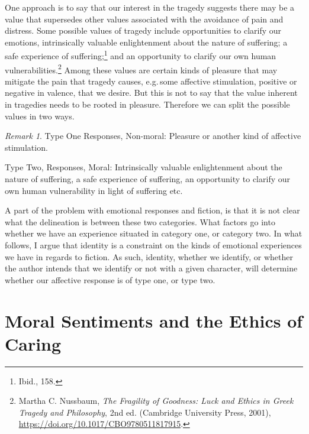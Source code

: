 \documentclass[phdthesis,12pt,final]{wuthesis}
\theoremstyle{definition}
\theoremstyle{definition}
\theoremstyle{definition}
\theoremstyle{definition}
\theoremstyle{remark}
\newtheorem*{remark}{Remark}
\begin{document}
One approach is to say that our interest in the tragedy suggests there may be a value that supersedes other values associated with the avoidance of pain and distress. Some possible values of tragedy include opportunities to clarify our emotions, intrinsically valuable enlightenment about the nature of suffering; a safe experience of suffering;\footnote{Ibid., 158.} and an opportunity to clarify our own human vulnerabilities.\footnote{Martha C. Nussbaum, \emph{The {Fragility} of {Goodness}: {Luck} and {Ethics} in {Greek Tragedy} and {Philosophy}}, 2nd ed. (Cambridge University Press, 2001), \url{https://doi.org/10.1017/CBO9780511817915}.} Among these values are certain kinds of pleasure that may mitigate the pain that tragedy causes, e.g.\,some affective stimulation, positive or negative in valence, that we desire. But this is not to say that the value inherent in tragedies needs to be rooted in pleasure. Therefore we can split the possible values in two ways.

\begin{remark}
Type One Responses, Non-moral: Pleasure or another kind of affective stimulation.

Type Two, Responses, Moral: Intrinsically valuable enlightenment about the nature of suffering, a safe experience of suffering, an opportunity to clarify our own human vulnerability in light of suffering etc.
\end{remark}

A part of the problem with emotional responses and fiction, is that it is not clear what the delineation is between these two categories. What factors go into whether we have an experience situated in category one, or category two. In what follows, I argue that identity is a constraint on the kinds of emotional experiences we have in regards to fiction. As such, identity, whether we identify, or whether the author intends that we identify or not with a given character, will determine whether our affective response is of type one, or type two.

\section{Moral Sentiments and the Ethics of Caring}\label{moral-sentiments-and-the-ethics-of-caring}
\end{document}
